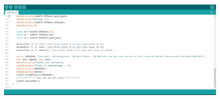 \begin{enumerate}
\begin{figure}[!h]
\end{figure}
\begin{figure}[!h]
	\centerline{\includegraphics[width=1.1\textwidth]{code23}}
\end{figure}
\end{enumerate}